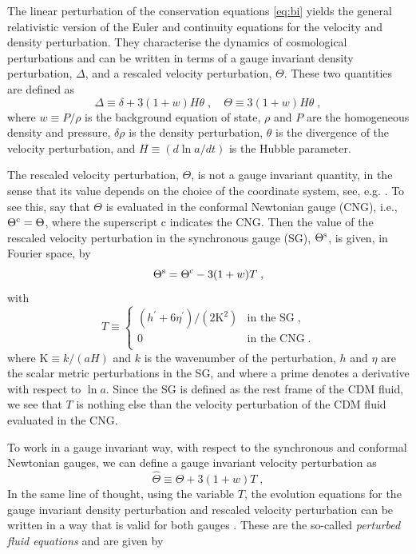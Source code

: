 \documentclass[nofootinbib,a4paper,aps,prd,10pt,superscriptaddress,reprint,showkeys,showpacs]{revtex4-1}
\def\be{\begin{equation}}
\def\ee{\end{equation}}
\begin{document}
The linear perturbation of the conservation equations \eqref{eq:bi} yields the general relativistic version of the 
Euler and continuity equations for the velocity and density perturbation. They characterise the dynamics of 
cosmological perturbations and can be written in terms of a gauge invariant density perturbation, $\Delta$, and a 
rescaled velocity perturbation, $\Theta$. These two quantities are defined as
\be
 \Delta \equiv \delta+3(1+w)H\theta\;, \quad \Theta \equiv 3(1+w)H\theta\;,
\ee
where $w\equiv P/\rho$ is the background equation of state, $\rho$ and $P$ are the homogeneous density and pressure, 
$\delta\rho$ is the density perturbation, $\theta$ is the divergence of the velocity perturbation, and 
$H\equiv (d\ln{a}/dt)$ is the Hubble parameter.

The rescaled velocity perturbation, $\Theta$, is not a gauge invariant quantity, in the sense that its value depends on 
the choice of the coordinate system, see, e.g. \cite{Ma1995}. To see this, say that $\Theta$ is evaluated in the 
conformal Newtonian gauge (CNG), i.e., $\Theta^{\rm c}=\Theta$, where the superscript $\mathrm{c}$ indicates the CNG. 
Then the value of the rescaled velocity perturbation in the synchronous gauge (SG), $\Theta^{\rm s}$, is given, in 
Fourier space, by
\be
 \Theta^{\rm s} = \Theta^{\rm c}-3(1+w)T\;,\label{eq:S-C}
\ee
with
\be
 T\equiv\begin{cases}
 (h^\prime+6\eta^\prime)/(2\mathrm{K}^2) & \mathrm{in}\,\,\mathrm{the}\,\,\mathrm{SG}\;, \\
 0 & \mathrm{in}\,\,\mathrm{the}\,\, \mathrm{CNG}\;.\\
\end{cases}
\ee
where $\mathrm{K}\equiv k/(aH)$ and $k$ is the wavenumber of the perturbation, $h$ and $\eta$ are the scalar metric 
perturbations in the SG, and where a prime denotes a derivative with respect to $\ln{a}$. Since the SG is defined as 
the rest frame of the CDM fluid, we see that $T$ is nothing else than the velocity perturbation of the CDM fluid 
evaluated in the CNG.

To work in a gauge invariant way, with respect to the synchronous and conformal Newtonian gauges, we can define a gauge 
invariant velocity perturbation as
\be\label{eq:T}
 \hat{\Theta} \equiv \Theta + 3(1+w)T\;,
\ee
In the same line of thought, using the variable $T$, the evolution equations for the gauge invariant density 
perturbation and rescaled velocity perturbation can be written in a way that is valid for both gauges 
\citep{Battye2016a}. These are the so-called \textit{perturbed fluid equations} and are given by
\end{document}
